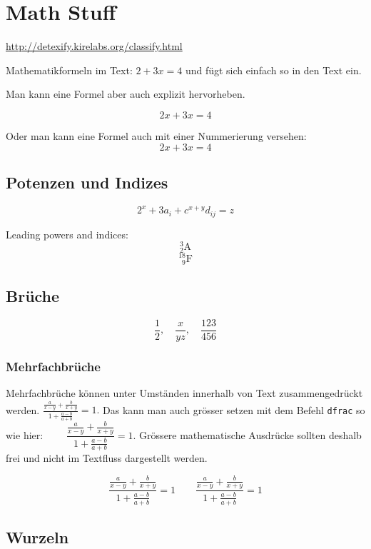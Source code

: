 \documentclass[10pt, a4paper]{article}
\numberwithin{equation}{section}
\numberwithin{figure}{section}
\begin{document}
\section{Math Stuff}

\url{http://detexify.kirelabs.org/classify.html}

Mathematikformeln im Text: \( 2 + 3x = 4\) und fügt sich einfach so in den Text ein.

Man kann eine Formel aber auch explizit hervorheben.

\[ 2x + 3x = 4 \]

Oder man kann eine Formel auch mit einer Nummerierung versehen:
\begin{equation}
2x + 3x = 4
\end{equation}

\subsection{Potenzen und Indizes}

\[ 2^x + 3a_i + c^{x+y}d_{ij} = z  \]


Leading powers and indices:
\[ {}^3_2\mathrm{A}
\]
\[{}^{18}_{\phantom{1}9}\mathrm{F}\]


\subsection{Brüche}

\[\frac{1}{2}, \quad \frac{x}{yz},\quad \frac{123}{456}\]

\subsubsection{Mehrfachbrüche}

Mehrfachbrüche können unter Umständen innerhalb von Text zusammengedrückt werden. \( \frac{\frac{a}{x-y}+\frac{b}{x+y}}{1+\frac{a-b}{a+b}} = 1. \) Das kann man auch gr\"osser setzen mit dem Befehl \texttt{dfrac} so wie hier: \( \qquad \dfrac{\frac{a}{x-y}+\frac{b}{x+y}}{1+\frac{a-b}{a+b}} = 1 \). Grössere mathematische Ausdrücke sollten deshalb frei und nicht im Textfluss dargestellt werden.

\[\frac{\frac{a}{x-y}+\frac{b}{x+y}}{1+\frac{a-b}{a+b}} = 1 \qquad \dfrac{\frac{a}{x-y}+\frac{b}{x+y}}{1+\frac{a-b}{a+b}} = 1 \]

\subsection{Wurzeln}
\end{document}
